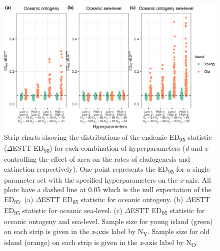 \begin{figure}
    \centering
    \includegraphics{oceanic_hyperparameters_endemic_nltt.png}
    \caption{Strip charts showing the distributions of the endemic ED\textsubscript{95} statistic ($\Delta$ESTT ED\textsubscript{95}) for each combination of hyperparameters (\textit{d} and \textit{x} controlling the effect of area on the rates of cladogenesis and extinction respectively). One point represents the ED\textsubscript{95} for a single parameter set with the specified hyperparameters on the \textit{x}-axis. All plots have a dashed line at 0.05 which is the null expectation of the ED\textsubscript{95}. (a) $\Delta$ESTT ED\textsubscript{95} statistic for oceanic ontogeny. (b) $\Delta$ESTT ED\textsubscript{95} statistic for oceanic sea-level. (c) $\Delta$ESTT ED\textsubscript{95} statistic for oceanic ontogeny and sea-level. Sample size for young island (green) on each strip is given in the \textit{x}-axis label by N\textsubscript{Y}. Sample size for old island (orange) on each strip is given in the \textit{x}-axis label by N\textsubscript{O}.}
    \label{fig:oceanic_hyperparameters_endemic_nltt}
\end{figure}

